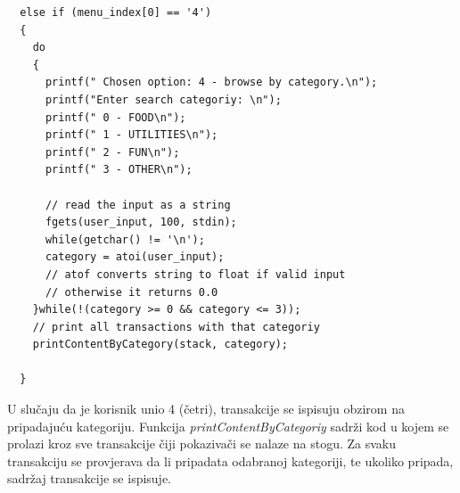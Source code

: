 \documentclass[12pt, letterpaper]{article}
\begin{document}
  \begin{verbatim}
  else if (menu_index[0] == '4')
  {
    do
    {
      printf(" Chosen option: 4 - browse by category.\n");
      printf("Enter search categoriy: \n");
      printf(" 0 - FOOD\n");
      printf(" 1 - UTILITIES\n");
      printf(" 2 - FUN\n");
      printf(" 3 - OTHER\n");
      
      // read the input as a string
      fgets(user_input, 100, stdin);
      while(getchar() != '\n');
      category = atoi(user_input);
      // atof converts string to float if valid input
      // otherwise it returns 0.0
    }while(!(category >= 0 && category <= 3));
    // print all transactions with that categoriy
    printContentByCategory(stack, category);

  }
  \end{verbatim}
  U slučaju da je korisnik unio 4 (četri), transakcije se ispisuju obzirom na pripadajuću kategoriju. Funkcija \textit{printContentByCategoriy} sadrži kod u kojem se prolazi kroz sve transakcije čiji pokazivači se nalaze na stogu. Za svaku transakciju se provjerava da li pripadata odabranoj kategoriji, te ukoliko pripada, sadržaj transakcije se ispisuje.
  
\end{document}
